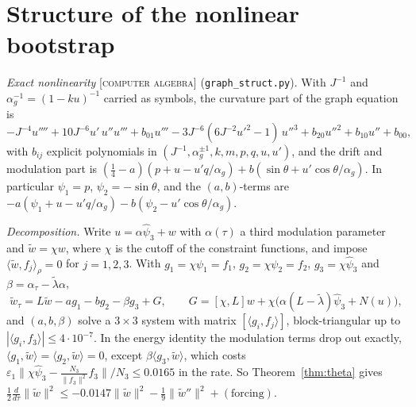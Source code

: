 \documentclass[11pt]{amsart}
\theoremstyle{remark}
\newcommand{\eps}{\varepsilon}
\newcommand{\ip}[2]{\langle #1,#2\rangle}
\newcommand{\lab}[1]{\textup{\textsc{[#1]}}}
\begin{document}
\section{Structure of the nonlinear bootstrap}\label{sec:boot}

\emph{Exact nonlinearity} \lab{computer algebra} (\texttt{graph\_struct.py}). With $J^{-1}$ and $\alpha_g^{-1}=(1-ku)^{-1}$ carried as symbols, the curvature part of the graph equation is
\[
-J^{-4}u''''+10J^{-6}u'\,u''u'''+b_{01}u'''-3J^{-6}(6J^{-2}u'^2-1)\,u''^3+b_{20}u''^2+b_{10}u''+b_{00},
\]
with $b_{ij}$ explicit polynomials in $(J^{-1},\alpha_g^{\pm1},k,m,p,q,u,u')$, and the drift and modulation part is $(\frac14-a)(p+u-u'q/\alpha_g)+b(\sin\theta+u'\cos\theta/\alpha_g)$. In particular $\psi_1=p$, $\psi_2=-\sin\theta$, and the $(a,b)$-terms are $-a(\psi_1+u-u'q/\alpha_g)-b(\psi_2-u'\cos\theta/\alpha_g)$.

\emph{Decomposition.} Write $u=\alpha\hat\psi_3+w$ with $\alpha(\tau)$ a third modulation parameter and $\tilde w=\chi w$, where $\chi$ is the cutoff of the constraint functions, and impose $\ip{\tilde w}{f_j}_\rho=0$ for $j=1,2,3$. With $g_1=\chi\psi_1=f_1$, $g_2=\chi\psi_2=f_2$, $g_3=\chi\hat\psi_3$ and $\beta=\alpha_\tau-\tilde\lambda\alpha$,
\[
\tilde w_\tau=L\tilde w-a g_1-b g_2-\beta g_3+G,\qquad G=[\chi,L]w+\chi\big(\alpha(L-\tilde\lambda)\hat\psi_3+N(u)\big),
\]
and $(a,b,\beta)$ solve a $3\times3$ system with matrix $[\ip{g_i}{f_j}]$, block-triangular up to $|\ip{g_i}{f_3}|\le4\cdot10^{-7}$. In the energy identity the modulation terms drop out exactly, $\ip{g_1}{\tilde w}=\ip{g_2}{\tilde w}=0$, except $\beta\ip{g_3}{\tilde w}$, which costs $\eps_1\|\chi\hat\psi_3-\frac{N_3}{\|f_3\|^2}f_3\|/N_3\le0.0165$ in the rate. So Theorem~\ref{thm:theta} gives $\frac12\frac d{d\tau}\|\tilde w\|^2\le-0.0147\|\tilde w\|^2-\frac19\|\tilde w''\|^2+(\text{forcing})$.
\end{document}
